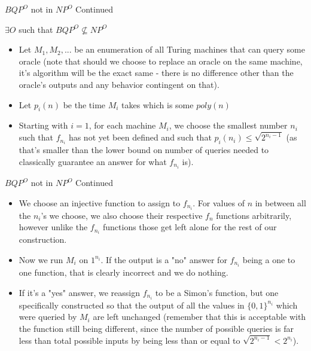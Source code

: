 \documentclass[aspectratio=169]{beamer}
\begin{document}
\begin{frame}{$BQP^O$ not in $NP^O$ Continued}
  \begin{itemize}
    \begin{thrm}
      $\exists O$ such that $BQP^O \nsubseteq NP^O$
    \end{thrm} \pause
    \begin{pf}
    \begin{itemize}
        \item Let $M_1, M_2,...$ be an enumeration of all Turing machines that can query some oracle (note that should we choose to replace an oracle on the same machine, it's algorithm will be the exact same - there is no difference other than the oracle's outputs and any behavior contingent on that). \pause
        \item Let $p_i(n)$ be the time $M_i$ takes which is some $poly(n)$ \pause
        \item Starting with $i = 1$, for each machine $M_i$, we choose the smallest number $n_i$ such that $f_{n_i}$ has not yet been defined and such that $p_i(n_i) \leq \sqrt{2^{n_i - 1}}$ (as that's smaller than the lower bound on number of queries needed to classically guarantee an answer for what $f_{n_i}$ is). 
    \end{itemize}
    \end{pf}
  \end{itemize}
\end{frame}

\begin{frame}{$BQP^O$ not in $NP^O$ Continued}
  \begin{itemize}
    \begin{pf}
    \begin{itemize}
        \item We choose an injective function to assign to $f_{n_i}$. For values of $n$ in between all the $n_i$'s we choose, we also choose their respective $f_n$ functions arbitrarily, however unlike the $f_{n_i}$ functions those get left alone for the rest of our construction. \pause
        \item Now we run $M_i$ on $1^{n_i}$. If the output is a "no" answer for $f_{n_i}$ being a one to one function, that is clearly incorrect and we do nothing. \pause
        \item If it's a "yes" answer, we reassign $f_{n_i}$ to be a Simon's function, but one specifically constructed so that the output of all the values in $\{0, 1\}^{n_i}$ which were queried by $M_i$ are left unchanged (remember that this is acceptable with the function still being different, since the number of possible queries is far less than total possible inputs by being less than or equal to $\sqrt{2^{n_i - 1}} < 2^{n_i}$).
    \end{itemize}
    \end{pf}
  \end{itemize}
\end{frame}
\end{document}
